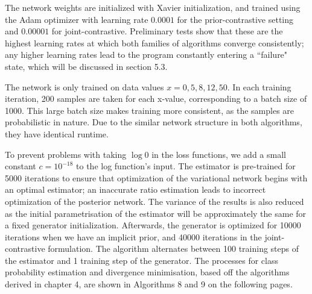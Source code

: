 \documentclass[honours,12pt]{unswthesis}
\numberwithin{equation}{section}
\theoremstyle{definition}
\begin{document}
\newpage
The network weights are initialized with Xavier initialization, and trained using the Adam optimizer with learning rate $0.0001$ for the prior-contrastive setting and $0.00001$ for joint-contrastive. Preliminary tests show that these are the highest learning rates at which both families of algorithms converge consistently; any higher learning rates lead to the program constantly entering a ``failure" state, which will be discussed in section 5.3.

The network is only trained on data values $x=0,5,8,12,50$. In each training iteration, 200 samples are taken for each x-value, corresponding to a batch size of 1000. This large batch size makes training more consistent, as the samples are probabilistic in nature. Due to the similar network structure in both algorithms, they have identical runtime.

To prevent problems with taking $\log 0$ in the loss functions, we add a small constant $c=10^{-18}$ to the log function's input. The estimator is pre-trained for 5000 iterations to ensure that optimization of the variational network begins with an optimal estimator; an inaccurate ratio estimation leads to incorrect optimization of the posterior network. The variance of the results is also reduced as the initial parametrisation of the estimator will be approximately the same for a fixed generator initialization. Afterwards, the generator is optimized for 10000 iterations when we have an implicit prior, and 40000 iterations in the joint-contrastive formulation. The algorithm alternates between 100 training steps of the estimator and 1 training step of the generator. The processes for class probability estimation and divergence minimisation, based off the algorithms derived in chapter 4, are shown in Algorithms 8 and 9 on the following pages.
\end{document}
